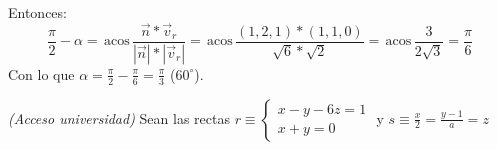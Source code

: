 \documentclass[a4paper,11pt,answers]{exam}
\newcommand{\acos}{\,\mathrm{acos}\,}
\begin{document}
\begin{questions}
\begin{solution}
\begin{parts}
Entonces:
\[\frac{\pi}{2}-\alpha = \acos \frac{\vec{n} * \vec{v}_r}{|\vec{n}| * |\vec{v}_r|}
=\acos \frac{(1,2,1)*(1,1,0)}{\sqrt{6}*\sqrt{2}} = \acos \frac{3}{2\sqrt{3}} = \frac{\pi}{6}\]
Con lo que $\alpha = \frac{\pi}{2} - \frac{\pi}{6} = \frac{\pi}{3}$ ($60^\circ$).
\end{parts}


\end{solution}

\question \textit{(Acceso universidad)} Sean las rectas $r \equiv \begin{cases}
	x - y - 6z = 1\\x+y=0
\end{cases}$ y $s \equiv \frac{x}{2} = \frac{y -1}{a} = z$
\begin{solution}
\begin{parts}

\end{parts}
\end{solution}
\end{questions}
\end{document}
